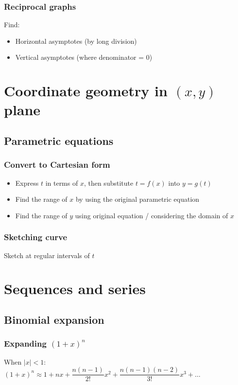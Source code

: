 \documentclass[A4paper]{article}
\begin{document}
	\subsubsection{Reciprocal graphs}
	Find:
	\begin{itemize}
		\item Horizontal asymptotes (by long division)
		\item Vertical asymptotes (where denominator = $0$)
	\end{itemize}


	\pagebreak

	\section{Coordinate geometry in $(x,y)$ plane}

	\subsection{Parametric equations}
	\subsubsection{Convert to Cartesian form}
	\begin{itemize}
		\item Express $t$ in terms of $x$, then substitute $t=f(x)$ into $y=g(t)$
		\item Find the range of $x$ by using the original parametric equation
		\item Find the range of $y$ using original equation / considering the domain of $x$
	\end{itemize}
	\subsubsection{Sketching curve}
	Sketch at regular intervals of $t$


	\pagebreak

	\section{Sequences and series}
	\subsection{Binomial expansion}
	\subsubsection{Expanding $(1+x)^n$}
	When $|x|<1$:\\
	$(1+x)^n\approx 1 + nx + \dfrac{n(n-1)}{2!}x^2+\dfrac{n(n-1)(n-2)}{3!}x^3+\dots$
\end{document}
